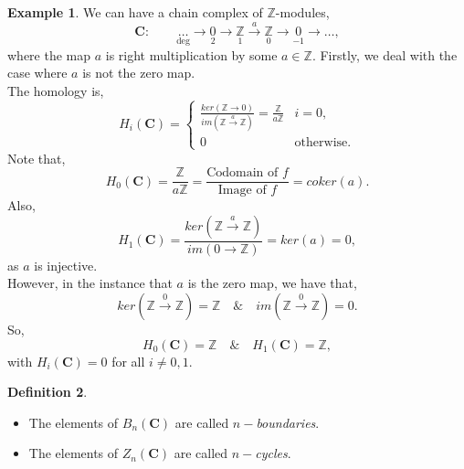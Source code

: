 \documentclass[11.5pt, twoside, a4paper, titlepage]{report}
\providecommand{\bb}[1]{\mathbb{#1}}
\theoremstyle{definition}
\newtheorem{mydef}{Definition}[section]
\newtheorem{eg}[mydef]{Example}
\theoremstyle{plain}
\begin{document}
\begin{eg} \label{chainZeg}
We can have a chain complex of $\mathbb{Z}$-modules,
\begin{equation*}
\mathbf{C}: \qquad \underset{\text{deg}}{\dots} \xrightarrow{}\underset{2}{0} \xrightarrow{} \underset{1}{\mathbb{Z}} \xrightarrow{a}\underset{0}{\mathbb{Z}} \xrightarrow{} \underset{-1}{0} \xrightarrow{}\dots,
\end{equation*}
where the map $a$ is right multiplication by some $a \in \mathbb{Z}$. Firstly, we deal with the case where $a$ is not the zero map. \\
The homology is,
\begin{equation*}
H_i(\mathbf{C}) = 
\begin{cases}
\frac{ker(\mathbb{Z}\xrightarrow{} 0)}{im(\mathbb{Z}\xrightarrow{a}\mathbb{Z})}=\frac{\mathbb{Z}}{a\mathbb{Z}} & i=0,\\
0 & \text{otherwise}.
\end{cases}
\end{equation*}
Note that,
\begin{equation*}
H_0(\mathbf{C})=\frac{\bb{Z}}{a\bb{Z}}= \frac{\text{Codomain of }f}{\text{Image of }f}=coker(a).
\end{equation*}
Also,
\begin{equation*}
H_1(\mathbf{C})=\frac{ker(\bb{Z}\xrightarrow{a}\bb{Z})}{im(0\xrightarrow{}\bb{Z})}=ker(a)=0,
\end{equation*}
as $a$ is injective.\\
However, in the instance that $a$ is the zero map, we have that,
\begin{equation*}
ker(\bb{Z} \xrightarrow{0} \bb{Z})=\bb{Z} \quad \& \quad im(\bb{Z} \xrightarrow{0} \bb{Z})=0.
\end{equation*}
So,
\begin{equation*}
H_0(\mathbf{C})=\bb{Z} \quad \& \quad H_1(\mathbf{C})=\bb{Z},
\end{equation*}
with $H_i(\mathbf{C})=0$ for all $i \neq 0,1$.
\end{eg}

\begin{mydef}
\begin{itemize}
\item The elements of $B_n(\mathbf{C})$ are called \emph{$n-$boundaries}.
\item The elements of $Z_n(\mathbf{C})$ are called \emph{$n-$cycles}.
\end{itemize}
\end{mydef}
\end{document}
